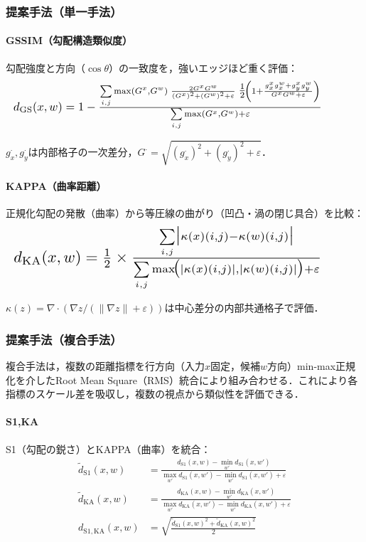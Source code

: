 \documentclass{jarticle}
\theoremstyle{definition}
\newcommand{\halfeq}[2][0.90\linewidth]{%
  \begin{equation}
    \makebox[\linewidth][l]{\resizebox{#1}{!}{\ensuremath{#2}}}%
  \end{equation}
}
\begin{document}
\subsubsection*{提案手法（単一手法）}
\paragraph{GSSIM（勾配構造類似度）}
勾配強度と方向（$\cos\theta$）の一致度を，強いエッジほど重く評価：
\halfeq{%
d_{\mathrm{GS}}(x,w)=1-
\frac{\sum\limits_{i,j} \max(G^x,G^w)\;
\frac{2G^xG^w}{(G^x)^2+(G^w)^2+\varepsilon}\;
\tfrac{1}{2}\!\left(1+\frac{g_x^x g_x^w+g_y^x g_y^w}{G^x G^w+\varepsilon}\right)
}{\sum\limits_{i,j}\max(G^x,G^w)+\varepsilon}%
}
$g_x^\cdot,g_y^\cdot$は内部格子の一次差分，$G^\cdot=\sqrt{(g_x^\cdot)^2+(g_y^\cdot)^2+\varepsilon}$．

\paragraph{KAPPA（曲率距離）}
正規化勾配の発散（曲率）から等圧線の曲がり（凹凸・渦の閉じ具合）を比較：
\halfeq{%
d_{\mathrm{KA}}(x,w)=\tfrac{1}{2}\times
\frac{\sum\limits_{i,j}\bigl|\kappa(x)(i,j)-\kappa(w)(i,j)\bigr|}
{\sum\limits_{i,j}\max\!\bigl(|\kappa(x)(i,j)|,|\kappa(w)(i,j)|\bigr)+\varepsilon}%
}
$\kappa(z)=\nabla\cdot\left(\nabla z/(\|\nabla z\|+\varepsilon)\right)$は中心差分の内部共通格子で評価．

\subsubsection*{提案手法（複合手法）}
複合手法は，複数の距離指標を行方向（入力$x$固定，候補$w$方向）min-max正規化を介したRoot Mean Square（RMS）統合により組み合わせる．これにより各指標のスケール差を吸収し，複数の視点から類似性を評価できる．

\paragraph{S1,KA}
S1（勾配の鋭さ）とKAPPA（曲率）を統合：
\begin{align}
\tilde d_{\mathrm{S1}}(x,w)&=\frac{d_{\mathrm{S1}}(x,w)-\min_{w'}d_{\mathrm{S1}}(x,w')}{\max_{w'}d_{\mathrm{S1}}(x,w')-\min_{w'}d_{\mathrm{S1}}(x,w')+\varepsilon}\\
\tilde d_{\mathrm{KA}}(x,w)&=\frac{d_{\mathrm{KA}}(x,w)-\min_{w'}d_{\mathrm{KA}}(x,w')}{\max_{w'}d_{\mathrm{KA}}(x,w')-\min_{w'}d_{\mathrm{KA}}(x,w')+\varepsilon}\\
d_{\mathrm{S1,KA}}(x,w)&=\sqrt{\frac{\tilde d_{\mathrm{S1}}(x,w)^2+\tilde d_{\mathrm{KA}}(x,w)^2}{2}}
\end{align}
\end{document}
